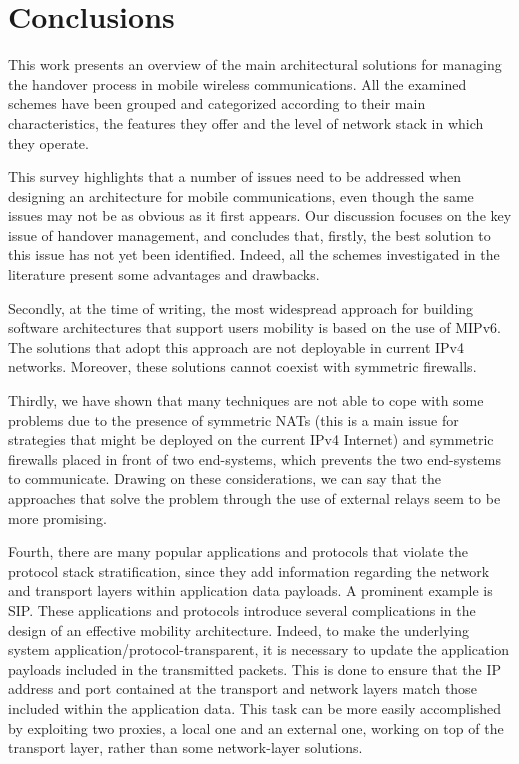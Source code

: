 \documentclass[preprint,12pt]{elsarticle}
\begin{document}
\section{Conclusions}
\label{sec:conc}

This work presents an overview of the main architectural solutions for managing the handover process in mobile wireless communications.  
All the examined schemes have been grouped and categorized according to their main 
characteristics, the features they offer and the level of network 
stack in which they operate.  

This survey highlights that a number of issues need to be addressed when 
designing an architecture for mobile communications, even though the same issues may not be as obvious as it first appears. 
Our discussion focuses on the key issue of handover management, 
and concludes that, firstly, the best solution to this issue has 
not yet been identified. Indeed, all the schemes investigated in the literature present some advantages and drawbacks.  

Secondly, at the time of writing, the most widespread approach for building software 
architectures that support users mobility is based on the use of MIPv6. The 
solutions that adopt this approach are not deployable in current IPv4 networks.  
Moreover, these solutions cannot coexist with symmetric firewalls.

Thirdly, we have shown that many techniques are not able to cope with some problems 
due to the presence of symmetric NATs (this is a main issue for strategies 
that might be deployed on the current IPv4 Internet) and symmetric firewalls 
placed in front of two end-systems, which prevents the two end-systems to communicate. Drawing on these considerations, we can say that the approaches that solve the 
problem through the use of external relays seem to be more promising. 

Fourth, there are many popular applications and protocols that violate the protocol stack stratification, since they add information regarding the network and transport layers within application data payloads. 
A prominent example is SIP. 
These applications and protocols introduce several complications in the design of an effective mobility architecture. Indeed, to make the underlying system application/protocol-transparent, it is necessary to update the application payloads included in the transmitted packets. 
This is done to ensure that the IP address and port contained at the transport and network layers match those included within the application data. 
This task can be more easily accomplished by exploiting two proxies, a local one and an external one, working on top of the transport layer, rather than some network-layer solutions.
\end{document}
